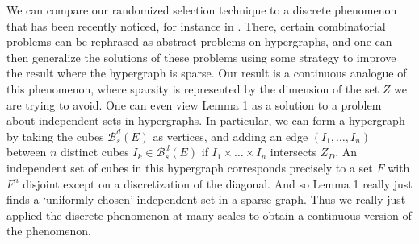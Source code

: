 \documentclass[usenames,dvipsnames]{article}
\theoremstyle{plain}
\theoremstyle{plain}
\begin{document}
We can compare our randomized selection technique to a discrete phenomenon that has been recently noticed, for instance in \cite{BaloghMorrisSamotij}. There, certain combinatorial problems can be rephrased as abstract problems on hypergraphs, and one can then generalize the solutions of these problems using some strategy to improve the result where the hypergraph is sparse. Our result is a continuous analogue of this phenomenon, where sparsity is represented by the dimension of the set $Z$ we are trying to avoid. One can even view Lemma 1 as a solution to a problem about independent sets in hypergraphs. In particular, we can form a hypergraph by taking the cubes $\mathcal{B}^d_s(E)$ as vertices, and adding an edge $(I_1, \dots, I_n)$ between $n$ distinct cubes $I_k \in \mathcal{B}^d_s(E)$ if $I_1 \times \dots \times I_n$ intersects $Z_D$. An independent set of cubes in this hypergraph corresponds precisely to a set $F$ with $F^n$ disjoint except on a discretization of the diagonal. And so Lemma 1 really just finds a `uniformly chosen' independent set in a sparse graph. Thus we really just applied the discrete phenomenon at many scales to obtain a continuous version of the phenomenon.



\end{document}
